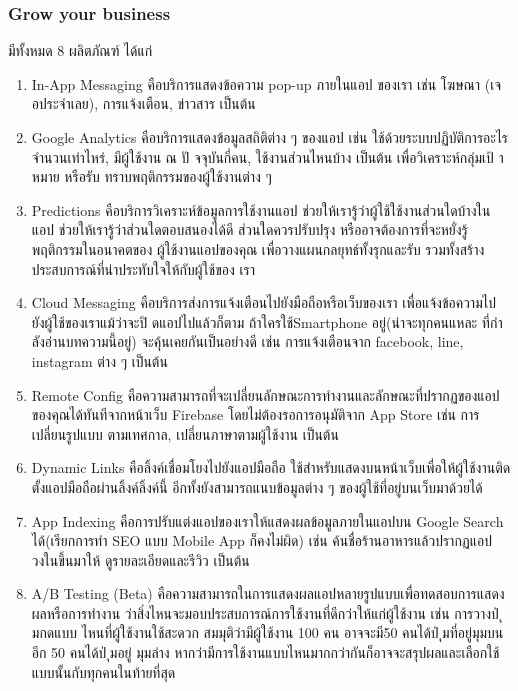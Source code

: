 \subsubsection{Grow your business}
มีทั้งหมด 8 ผลิตภัณฑ์ ได้แก่ 
\begin{enumerate}
  \item  In-App Messaging คือบริการแสดงข้อความ pop-up ภายในแอป
  ของเรา เช่น โฆษณา (เจอประจําเลย), การแจ้งเตือน, ข่าวสาร เป็นต้น

  \item  Google Analytics คือบริการแสดงข้อมูลสถิติต่าง ๆ ของแอป เช่น ใช้ด้วยระบบปฏิบัติการอะไร
  จํานวนเท่าไหร่, มีผู้ใช้งาน ณ ปั จจุบันกี่คน, ใช้งานส่วนไหนบ้าง เป็นต้น เพื่อวิเคราะห์กลุ่มเป้ าหมาย หรือรับ
  ทราบพฤติกรรมของผู้ใช้งานต่าง ๆ
  
  \item Predictions คือบริการวิเคราะห์ข้อมูลการใช้งานแอป ช่วยให้เรารู้ว่าผู้ใช้ใช้งานส่วนใดบ้างในแอป
  ช่วยให้เรารู้ว่าส่วนใดตอบสนองได้ดี ส่วนใดควรปรับปรุง หรืออาจต้องการที่จะหยั่งรู้พฤติกรรมในอนาคตของ
  ผู้ใช้งานแอปของคุณ เพื่อวางแผนกลยุทธ์ทั้งรุกและรับ รวมทั้งสร้างประสบการณ์ที่น่าประทับใจให้กับผู้ใช้ของ
  เรา
  \item Cloud Messaging คือบริการส่งการแจ้งเตือนไปยังมือถือหรือเว็บของเรา เพื่อแจ้งข้อความไป
  ยังผู้ใช้ของเราแม้ว่าจะปิ ดแอปไปแล้วก็ตาม ถ้าใครใช้Smartphone อยู่(น่าจะทุกคนแหละ ที่กําลังอ่านบทความนี้อยู่) จะคุ้นเคยกันเป็นอย่างดี เช่น การแจ้งเตือนจาก facebook, line, instagram ต่าง ๆ เป็นต้น
  
  \item    Remote Config คือความสามารถที่จะเปลี่ยนลักษณะการทํางานและลักษณะที่ปรากฏของแอป
  ของคุณได้ทันทีจากหน้าเว็บ Firebase โดยไม่ต้องรอการอนุมัติจาก App Store เช่น การเปลี่ยนรูปแบบ
  ตามเทศกาล, เปลี่ยนภาษาตามผู้ใช้งาน เป็นต้น
  \item   Dynamic Links คือลิ้งค์เชื่อมโยงไปยังแอปมือถือ ใช้สําหรับแสดงบนหน้าเว็บเพื่อให้ผู้ใช้งานติด
  ตั้งแอปมือถือผ่านลิ้งค์ลิ้งค์นี้ อีกทั้งยังสามารถแนบข้อมูลต่าง ๆ ของผู้ใช้ที่อยู่บนเว็บมาด้วยได้  
  \item    App Indexing คือการปรับแต่งแอปของเราให้แสดงผลข้อมูลภายในแอปบน Google Search
  ได้(เรียกการทํา SEO แบบ Mobile App ก็คงไม่ผิด) เช่น ค้นชื่อร้านอาหารแล้วปรากฏแอปวงในขึ้นมาให้
  ดูรายละเอียดและรีวิว เป็นต้น
  
  \item   A/B Testing (Beta) คือความสามารถในการแสดงผลแอปหลายรูปแบบเพื่อทดสอบการแสดง
  ผลหรือการทํางาน ว่าสิ่งไหนจะมอบประสบการณ์การใช้งานที่ดีกว่าให้แก่ผู้ใช้งาน เช่น การวางป่ ุมกดแบบ
  ไหนที่ผู้ใช้งานใช้สะดวก สมมุติว่ามีผู้ใช้งาน 100 คน อาจจะมี50 คนได้ป่ ุมที่อยู่มุมบน อีก 50 คนได้ป่ ุมอยู่
  มุมล่าง หากว่ามีการใช้งานแบบไหนมากกว่ากันก็อาจจะสรุปผลและเลือกใช้แบบนั้นกับทุกคนในท้ายที่สุด

\end{enumerate}

